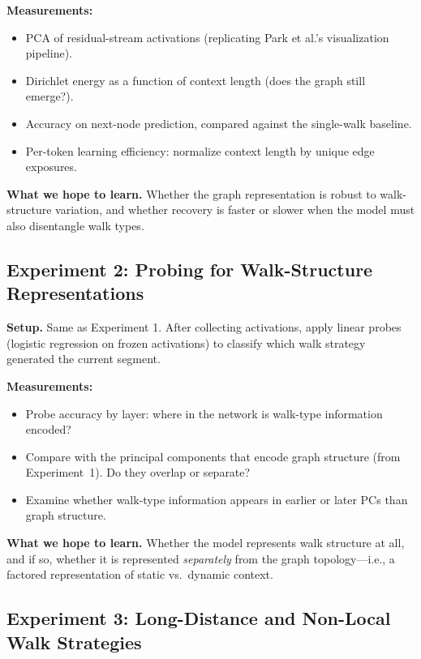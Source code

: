 \documentclass[11pt]{article}
\begin{document}
\textbf{Measurements:}
\begin{itemize}
    \item PCA of residual-stream activations (replicating Park et al.'s visualization pipeline).
    \item Dirichlet energy as a function of context length (does the graph still emerge?).
    \item Accuracy on next-node prediction, compared against the single-walk baseline.
    \item Per-token learning efficiency: normalize context length by unique edge exposures.
\end{itemize}

\textbf{What we hope to learn.} Whether the graph representation is robust to walk-structure variation, and whether recovery is faster or slower when the model must also disentangle walk types.

\subsection{Experiment 2: Probing for Walk-Structure Representations}

\textbf{Setup.} Same as Experiment 1. After collecting activations, apply linear probes (logistic regression on frozen activations) to classify which walk strategy generated the current segment.

\textbf{Measurements:}
\begin{itemize}
    \item Probe accuracy by layer: where in the network is walk-type information encoded?
    \item Compare with the principal components that encode graph structure (from Experiment~1). Do they overlap or separate?
    \item Examine whether walk-type information appears in earlier or later PCs than graph structure.
\end{itemize}

\textbf{What we hope to learn.} Whether the model represents walk structure at all, and if so, whether it is represented \emph{separately} from the graph topology---i.e., a factored representation of static vs.\ dynamic context.

\subsection{Experiment 3: Long-Distance and Non-Local Walk Strategies}
\end{document}
